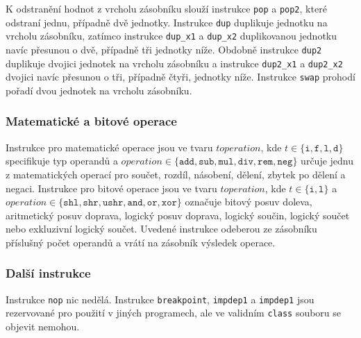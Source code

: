 K odstranění hodnot z vrcholu zásobníku slouží instrukce \texttt{pop} a \texttt{pop2}, které odstraní jednu, případně dvě jednotky. Instrukce \texttt{dup} duplikuje jednotku na vrcholu zásobníku, zatímco instrukce \texttt{dup\_x1} a \texttt{dup\_x2} duplikovanou jednotku navíc přesunou o dvě, případně tři jednotky níže. Obdobně instrukce \texttt{dup2} duplikuje dvojici jednotek na vrcholu zásobníku a instrukce \texttt{dup2\_x1} a \texttt{dup2\_x2} dvojici navíc přesunou o tři, případně čtyři, jednotky níže. Instrukce 
\texttt{swap} prohodí pořadí dvou jednotek na vrcholu zásobníku.

\subsubsection{Matematické a bitové operace}

Instrukce pro matematické operace jsou ve tvaru $t operation$, 
kde $t \in \{\texttt{i},\texttt{f}, \texttt{l}, \texttt{d} \}$ specifikuje typ operandů 
a $operation \in \{\texttt{add},\texttt{sub}, \texttt{mul}, \texttt{div}, \texttt{rem}, \texttt{neg} \}$ určuje jednu z matematických operací pro součet, rozdíl, násobení, dělení, zbytek po dělení a negaci. 
Instrukce pro bitové operace jsou ve tvaru $t operation$, 
kde $t \in \{\texttt{i}, \texttt{l}\}$ 
a $operation \in \{\texttt{shl},\texttt{shr}, \texttt{ushr}, \texttt{and}, \texttt{or}, \texttt{xor}\}$ označuje bitový posuv doleva, aritmetický posuv doprava, logický posuv doprava, logický součin, logický součet nebo  exkluzivní logický součet. 
Uvedené instrukce odeberou ze zásobníku příslušný počet operandů a vrátí na zásobník výsledek operace.

\subsubsection{Další instrukce}

Instrukce \texttt{nop} nic nedělá. Instrukce \texttt{breakpoint}, \texttt{impdep1} a \texttt{impdep1} jsou rezervované pro použití v jiných programech, ale ve validním \texttt{class} souboru se objevit nemohou.






